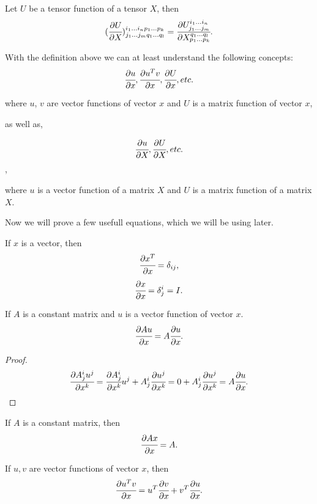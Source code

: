 \documentclass[main.tex]{subfiles}
\begin{document}
\begin{definition}
Let $U$ be a tensor function of a tensor $X$, then 
\begin{equation}
(\cfrac{\partial U}{\partial X})^{i_1\dots i_n p_1\dots p_k}_{j_1\dots j_m q_1\dots q_l} = \cfrac{\partial U^{i_1\dots i_n}_{j_1\dots j_m}}{\partial X^{q_1\dots q_l}_{p_1\dots p_k}}.
\end{equation}
\end{definition}

With the definition above we can at least understand the following concepts:
$$
\cfrac{\partial u}{\partial x}, \cfrac{\partial u^T v}{\partial x}, \cfrac{\partial U}{\partial x}, etc.
$$

where $u$, $v$ are vector functions of vector $x$ and $U$ is a matrix function of vector $x$, 

as well as,

$$
\cfrac{\partial u}{\partial X}, \cfrac{\partial U}{\partial X}, etc.
$$,

where $u$ is a vector function of a matrix $X$ and $U$ is a matrix function of a matrix $X$.


Now we will prove a few usefull equations, which we will be using later.

\begin{theorem}
If $x$ is a vector, then
\begin{equation}
\cfrac{\partial x^T}{\partial x} = \delta_{ij},
\end{equation}
\begin{equation}
\cfrac{\partial x}{\partial x} = \delta^i_j = I.
\end{equation}
\end{theorem}
\begin{theorem}
If $A$ is a constant matrix and $u$ is a vector function of vector $x$.
\begin{equation}
\cfrac{\partial Au}{\partial x} = A\cfrac{\partial u}{\partial x}.    
\end{equation}
\end{theorem}
\begin{proof}
\begin{equation}
\label{constant_out_fun}
\cfrac{\partial A^i_j u^j}{\partial x^k} = \cfrac{\partial A^i_j}{\partial x^k} u^j + A^i_j \cfrac{\partial u^j}{\partial x^k} = 0 + A^i_j \cfrac{\partial u^j}{\partial x^k} = A \cfrac{\partial u}{\partial x}.
\end{equation}
\end{proof}
\begin{corollary}
\label{constant_out}
If $A$ is a constant matrix, then
\begin{equation}
\cfrac{\partial Ax}{\partial x} = A.    
\end{equation}
\end{corollary}
\begin{theorem}
\label{deriviative_multiplication}
If $u, v$ are vector functions of vector $x$, then
\begin{equation}
\cfrac{\partial u^T v}{\partial x} = u^T \cfrac{\partial v}{\partial x} + v^T \cfrac{\partial u}{\partial x}.
\end{equation}
\end{theorem}
\end{document}
